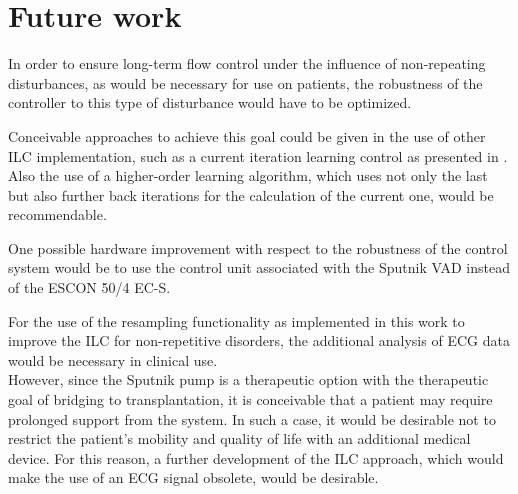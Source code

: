 \section{Future work}
In order to ensure long-term flow control under the influence of non-repeating disturbances, as would be necessary for use on patients, the robustness of the controller to this type of disturbance would have to be optimized.

Conceivable approaches to achieve this goal could be given in the use of other ILC implementation, such as a current iteration learning control as presented in \cite{ILC2}. Also the use of a higher-order learning algorithm, which uses not only the last but also further back iterations for the calculation of the current one, would be recommendable.

One possible hardware improvement with respect to the robustness of the control system would be to use the control unit associated with the Sputnik VAD instead of the ESCON 50/4 EC-S.

For the use of the resampling functionality as implemented in this work to improve the ILC for non-repetitive disorders, the additional analysis of ECG data would be necessary in clinical use.
\\However, since the Sputnik pump is a therapeutic option with the therapeutic goal of bridging to transplantation, it is conceivable that a patient may require prolonged support from the system. In such a case, it would be desirable not to restrict the patient's mobility and quality of life with an additional medical device. For this reason, a further development of the ILC approach, which would make the use of an ECG signal obsolete, would be desirable.

